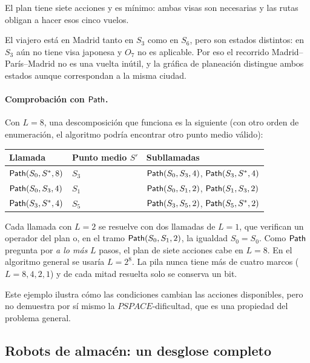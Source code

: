 \documentclass[11pt,letterpaper]{article}
\theoremstyle{plain}
\theoremstyle{definition}
\theoremstyle{remark}
\newcommand{\nombreMat}[1]{\ensuremath{\text{\fontencoding{OT1}\fontfamily{cmss}\upshape\selectfont #1}}}
\newcommand{\PSPACE}{\nombreMat{PSPACE}}
\newcommand{\NP}{\nombreMat{NP}}
\newcommand{\coNP}{\nombreMat{co-NP}}
\newcommand{\Path}{\nombreMat{Path}}
\def\PSPACE{PSPACE}\def\NP{NP}\def\coNP{co-NP}%
\begin{document}
El plan tiene siete acciones y es mínimo: ambas visas son
necesarias y las rutas obligan a hacer esos cinco vuelos.

El viajero está en Madrid tanto en $S_3$ como en $S_6$,
pero son estados distintos: en $S_3$ aún no tiene visa
japonesa y $O_7$ no es aplicable. Por eso el recorrido
Madrid--París--Madrid no es una vuelta inútil, y la gráfica
de planeación distingue ambos estados aunque correspondan
a la misma ciudad.

\paragraph{Comprobación con \Path.}
Con $L=8$, una descomposición que funciona es la
siguiente (con otro orden de enumeración, el algoritmo
podría encontrar otro punto medio válido):

\begin{center}
\small
\begin{tabular}{@{}lll@{}}
\toprule
Llamada & Punto medio $S'$ & Subllamadas\\
\midrule
$\Path(S_0,S^{*},8)$ & $S_3$ & $\Path(S_0,S_3,4)$, $\Path(S_3,S^{*},4)$\\
$\Path(S_0,S_3,4)$   & $S_1$ & $\Path(S_0,S_1,2)$, $\Path(S_1,S_3,2)$\\
$\Path(S_3,S^{*},4)$ & $S_5$ & $\Path(S_3,S_5,2)$, $\Path(S_5,S^{*},2)$\\
\bottomrule
\end{tabular}
\end{center}

Cada llamada con $L=2$ se resuelve con dos llamadas de
$L=1$, que verifican un operador del plan o, en el tramo
$\Path(S_0,S_1,2)$, la igualdad $S_0=S_0$. Como \Path{}
pregunta por \emph{a lo más} $L$ pasos, el plan de siete
acciones cabe en $L=8$. En el algoritmo general se usaría
$L=2^{8}$. La pila nunca tiene más de cuatro marcos
($L=8,4,2,1$) y de cada mitad resuelta solo se conserva
un bit.

Este ejemplo ilustra cómo las condiciones cambian las
acciones disponibles, pero no demuestra por sí mismo la
$\PSPACE$-dificultad, que es una propiedad del problema
general.






\subsection{Robots de almacén: un desglose completo}\label{sec:almacen}
\end{document}
